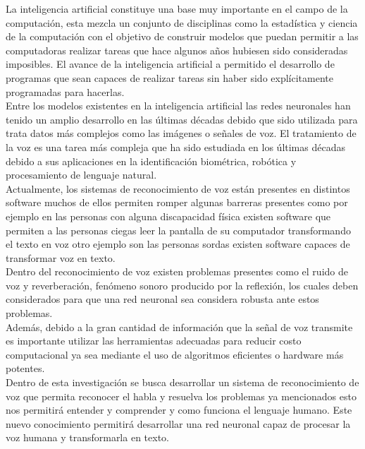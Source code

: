 La inteligencia artificial constituye una base muy importante en el campo de la computación, esta mezcla un conjunto de disciplinas como la estadística y ciencia de la computación con el objetivo de construir modelos que puedan permitir a las computadoras realizar tareas que hace algunos años hubiesen sido consideradas imposibles. El avance de la inteligencia artificial a permitido el desarrollo de programas que sean capaces de realizar tareas sin haber sido explícitamente programadas para hacerlas.\\
Entre los modelos existentes en la inteligencia artificial las redes neuronales han tenido un amplio desarrollo en las últimas décadas debido que sido utilizada para trata datos más complejos como las imágenes o señales de voz. El tratamiento de la voz es una tarea más compleja que ha sido estudiada en los últimas décadas debido a sus aplicaciones en la identificación biométrica, robótica y procesamiento de lenguaje natural.\\
Actualmente, los sistemas de reconocimiento de voz están presentes en distintos software muchos de ellos permiten romper algunas barreras presentes como por ejemplo en las personas con alguna discapacidad física existen software que permiten a las personas ciegas leer la pantalla de su computador transformando el texto en voz otro ejemplo son las personas sordas existen software capaces de transformar voz en texto.\\
Dentro del reconocimiento de voz existen problemas presentes como el ruido de voz y reverberación, fenómeno sonoro producido por la reflexión,  los cuales deben considerados para que una red neuronal sea considera robusta ante estos problemas.\\ Además, debido a la gran cantidad de información que la señal de voz transmite es importante utilizar las herramientas adecuadas para reducir costo computacional ya sea mediante el uso de algoritmos eficientes o hardware más potentes.\\
Dentro de esta investigación se busca desarrollar un sistema de reconocimiento de voz que permita reconocer el habla y resuelva los problemas ya mencionados esto nos permitirá entender y comprender y como funciona el lenguaje humano. Este nuevo conocimiento permitirá desarrollar 	una red neuronal capaz de procesar la voz humana y transformarla en texto. 


